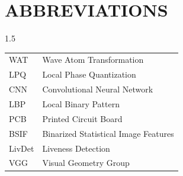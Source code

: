 \chapter*{ABBREVIATIONS}
\begin{spacing}{1.5}
\noindent
\begin{tabular}{p{3cm} p{10cm}}
WAT & Wave Atom Transformation \\
LPQ & Local Phase Quantization \\
CNN & Convolutional Neural Network \\
LBP & Local Binary Pattern \\
PCB & Printed Circuit Board \\
BSIF & Binarized Statistical Image Features \\
LivDet & Liveness Detection \\
VGG & Visual Geometry Group \\
\end{tabular}   
\end{spacing}
